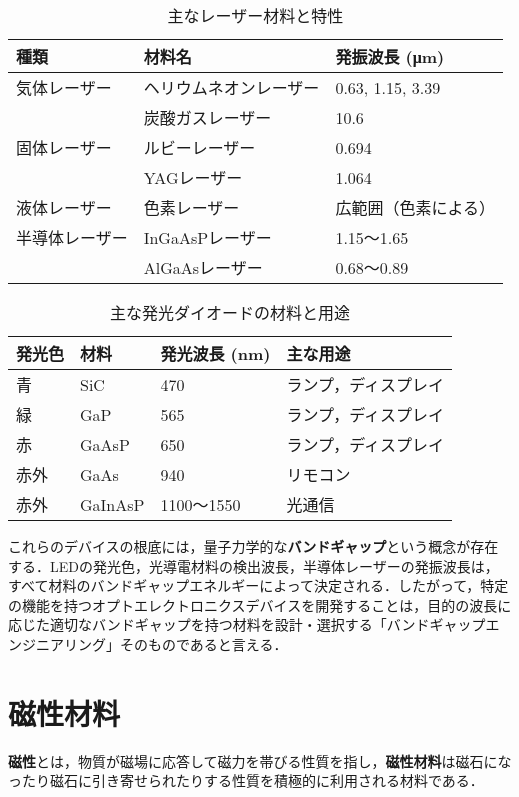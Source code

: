 \documentclass[11pt,a4paper]{ltjsarticle}
\newcommand{\supcite}[1]{\textsuperscript{\cite{#1}}}
\begin{document}
\begin{table}[H]
\caption{主なレーザー材料と特性\supcite{ref1}}
\label{tbl:laser_materials}
\centering
\begin{tabular}{lll}
\toprule
種類 & 材料名 & 発振波長 (\si{\micro\meter}) \\
\midrule
気体レーザー & ヘリウムネオンレーザー & 0.63, 1.15, 3.39 \\
 & 炭酸ガスレーザー & 10.6 \\
固体レーザー & ルビーレーザー & 0.694 \\
 & YAGレーザー & 1.064 \\
液体レーザー & 色素レーザー & 広範囲（色素による） \\
半導体レーザー & InGaAsPレーザー & 1.15～1.65 \\
 & AlGaAsレーザー & 0.68～0.89 \\
\bottomrule
\end{tabular}
\end{table}

\begin{table}[H]
\caption{主な発光ダイオードの材料と用途\supcite{ref1}}
\label{tbl:led_materials}
\centering
\begin{tabular}{llll}
\toprule
発光色 & 材料 & 発光波長 (\si{\nano\meter}) & 主な用途 \\
\midrule
青 & SiC & 470 & ランプ，ディスプレイ \\
緑 & GaP & 565 & ランプ，ディスプレイ \\
赤 & GaAsP & 650 & ランプ，ディスプレイ \\
赤外 & GaAs & 940 & リモコン \\
赤外 & GaInAsP & 1100～1550 & 光通信 \\
\bottomrule
\end{tabular}
\end{table}

これらのデバイスの根底には，量子力学的な\textbf{バンドギャップ}という概念が存在する．LEDの発光色，光導電材料の検出波長，半導体レーザーの発振波長は，すべて材料のバンドギャップエネルギーによって決定される．したがって，特定の機能を持つオプトエレクトロニクスデバイスを開発することは，目的の波長に応じた適切なバンドギャップを持つ材料を設計・選択する「バンドギャップエンジニアリング」そのものであると言える．

\section{磁性材料}

\textbf{磁性}とは，物質が磁場に応答して磁力を帯びる性質を指し，\textbf{磁性材料}は磁石になったり磁石に引き寄せられたりする性質を積極的に利用される材料である\supcite{ref1}．
\end{document}
